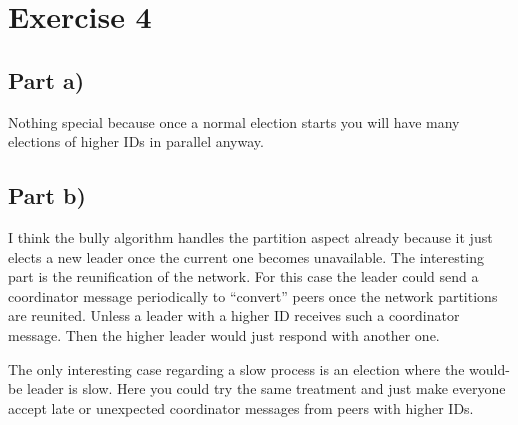 \documentclass[10pt,a4paper]{article}
\begin{document}
\section*{Exercise 4}

\subsection*{Part a)}

Nothing special because once a normal election starts you will have many elections of higher IDs in parallel anyway.

\subsection*{Part b)}

I think the bully algorithm handles the partition aspect already because it just elects a new leader once the current one becomes unavailable.
The interesting part is the reunification of the network.
For this case the leader could send a coordinator message periodically to ``convert'' peers once the network partitions are reunited.
Unless a leader with a higher ID receives such a coordinator message.
Then the higher leader would just respond with another one.

The only interesting case regarding a slow process is an election where the would-be leader is slow.
Here you could try the same treatment and just make everyone accept late or unexpected coordinator messages from peers with higher IDs.
\end{document}
